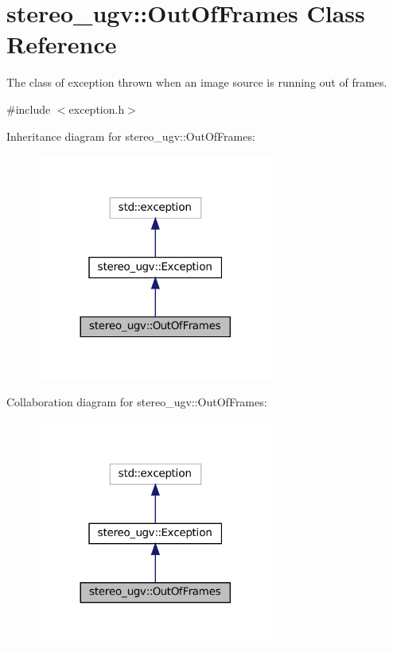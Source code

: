\hypertarget{classstereo__ugv_1_1OutOfFrames}{}\section{stereo\+\_\+ugv\+:\+:Out\+Of\+Frames Class Reference}
\label{classstereo__ugv_1_1OutOfFrames}


The class of exception thrown when an image source is running out of frames.  




{\ttfamily \#include $<$exception.\+h$>$}



Inheritance diagram for stereo\+\_\+ugv\+:\+:Out\+Of\+Frames\+:\nopagebreak
\begin{figure}[H]
\begin{center}
\leavevmode
\includegraphics[width=221pt]{classstereo__ugv_1_1OutOfFrames__inherit__graph}
\end{center}
\end{figure}


Collaboration diagram for stereo\+\_\+ugv\+:\+:Out\+Of\+Frames\+:\nopagebreak
\begin{figure}[H]
\begin{center}
\leavevmode
\includegraphics[width=221pt]{classstereo__ugv_1_1OutOfFrames__coll__graph}
\end{center}
\end{figure}
